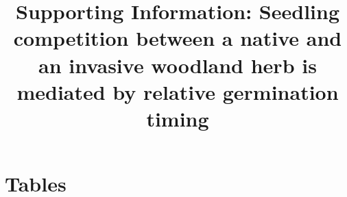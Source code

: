 \documentclass{article}
\title{Supporting Information: Seedling competition between a native %
and an invasive %
woodland herb is mediated by relative germination timing}
\date{}
\begin{document}



\maketitle
\section*{Tables}
\end{document}
